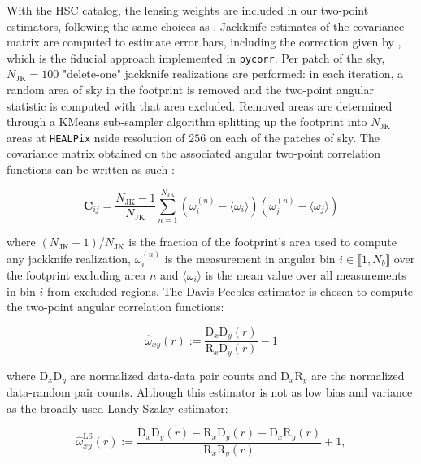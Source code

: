 With the HSC catalog, the lensing weights are included in our two-point estimators, following the same choices as \cite{HSCClusteringRau2023}. 
Jackknife estimates of the covariance matrix are computed to estimate error bars, including the correction given by \cite{Mohammad2022jackknife}, which is the fiducial approach implemented in \texttt{pycorr}. 
Per patch of the sky, $N_{\mathrm{JK}}=100$ "delete-one" jackknife realizations are performed: in each iteration, a random area of sky in the footprint is removed and the two-point angular statistic is computed with that area excluded. 
Removed areas are determined through a KMeans sub-sampler algorithm splitting up the footprint into $N_{\mathrm{JK}}$ areas at \texttt{HEALPix} \cite{Gorski2005HEALPix} nside resolution of $256$ on each of the patches of sky. The covariance matrix obtained on the associated angular two-point correlation functions can be written as such \cite{Mohammad2022jackknife}:

\begin{equation}
    \mathbf{C}_{ij}=\frac{N_{\mathrm{JK}}-1}{N_{\mathrm{JK}}}\sum^{N_{\mathrm{JK}}}_{n=1}(\omega^{(n)}_i-\langle\omega_i\rangle)(\omega^{(n)}_j-\langle\omega_j\rangle) %
\end{equation}

where $({N_{\mathrm{JK}}-1})/{N_{\mathrm{JK}}}$ is the fraction of the footprint's area used to compute any jackknife realization, $\omega^{(n)}_i$ is the measurement in angular bin $i\in\llbracket 1,N_b \rrbracket$  over the footprint excluding area $n$ and $\langle\omega_i\rangle$ is the mean value over all measurements in bin $i$ from excluded regions. The Davis-Peebles \cite{DavisPeebles1983} estimator is chosen to compute the two-point angular correlation functions:

\begin{equation}
    \hat{\omega}_{xy}(r):=\frac{\mathrm{D}_x\mathrm{D}_y(r)}{\mathrm{R}_x\mathrm{D}_y(r)}-1
\end{equation}

where $\mathrm{D}_x\mathrm{D}_y$ are normalized data-data pair counts and $\mathrm{D}_x\mathrm{R}_y$ are the normalized data-random pair counts. Although this estimator is not as low bias and variance as the broadly used Landy-Szalay \cite{LandySzalay1993} estimator:

\begin{equation}
    \hat{\omega}^{\mathrm{LS}}_{xy}(r):=\frac{\mathrm{D}_x\mathrm{D}_y(r)-\mathrm{R}_x\mathrm{D}_y(r)-\mathrm{D}_x\mathrm{R}_y(r)}{\mathrm{R}_x\mathrm{R}_y(r)}+1, 
\end{equation}

